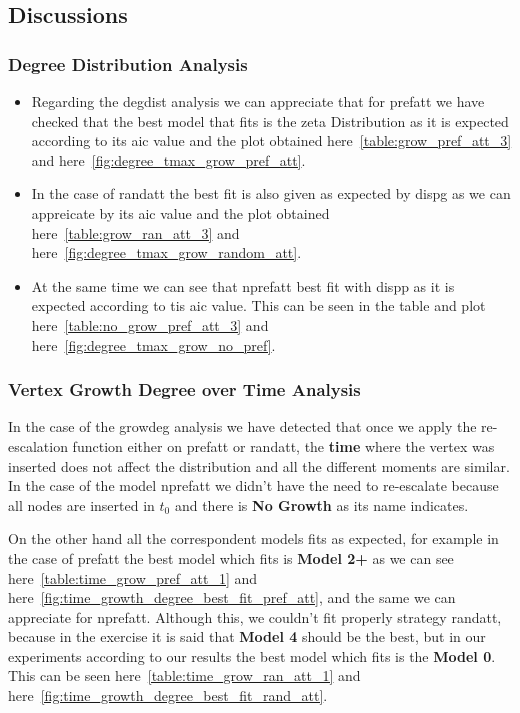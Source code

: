 \documentclass[12pt, a4paper]{article}
\begin{document}
\subsection{Discussions}\label{sec:disc}
\subsubsection{Degree Distribution Analysis}
\begin{itemize}
    \item Regarding the \acrshort{degdist} analysis we can appreciate that for \acrshort{prefatt} we have checked that the best model that fits is the \acrshort{zeta} Distribution as
    it is expected according to its \acrshort{aic} value and the plot obtained here~\ref{table:grow_pref_att_3} and here~\ref{fig:degree_tmax_grow_pref_att}.
    \item In the case of \acrshort{randatt} the best fit is also given as expected by \acrshort{dispg} as we can appreicate by its \acrshort{aic} value and the plot obtained here~\ref{table:grow_ran_att_3} and here~\ref{fig:degree_tmax_grow_random_att}.
    \item At the same time we can see that \acrshort{nprefatt} best fit with \acrshort{dispp} as it is expected according to tis \acrshort{aic} value. This can be seen in the table and plot here~\ref{table:no_grow_pref_att_3} and here~\ref{fig:degree_tmax_grow_no_pref}.
\end{itemize}

\subsubsection{Vertex Growth Degree over Time Analysis}
In the case of the \acrshort{growdeg} analysis we have detected that once we apply the re-escalation function either on \acrshort{prefatt} or \acrshort{randatt}, the \textbf{time} where the vertex 
was inserted does not affect the distribution and all the different moments are similar. In the case of the model \acrshort{nprefatt} we didn't have the need to re-escalate because all nodes are inserted
in $t_0$ and there is \textbf{No Growth} as its name indicates.

On the other hand all the correspondent models fits as expected, for example in the case of \acrshort{prefatt} the best model which fits is \textbf{Model 2+} as we can see here~\ref{table:time_grow_pref_att_1} and here~\ref{fig:time_growth_degree_best_fit_pref_att}, and
the same we can appreciate for \acrshort{nprefatt}. Although this, we couldn't fit properly strategy \acrshort{randatt}, because in the exercise it is said that \textbf{Model 4} should be the best, but in 
our experiments according to our results the best model which fits is the \textbf{Model 0}. This can be seen here~\ref{table:time_grow_ran_att_1} and here~\ref{fig:time_growth_degree_best_fit_rand_att}.
\end{document}

